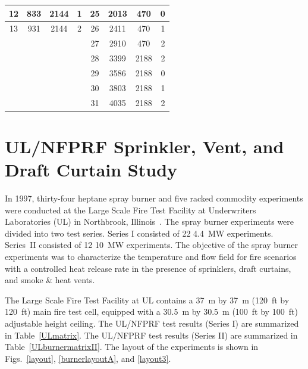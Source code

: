 \begin{table}[h!]
\begin{center}
\begin{tabular}{|c|c|c|c||c|c|c|c|}
12      & 833       & 2144          & 1         & 25      & 2013      & 470           & 0                 \\ \hline
13      & 931       & 2144          & 2         & 26      & 2411      & 470           & 1                 \\ \hline
\multicolumn{4}{|r||}{}                         & 27      & 2910      & 470           & 2                 \\ \cline{5-8}
\multicolumn{4}{|r||}{}                         & 28      & 3399      & 2188          & 2                 \\ \cline{5-8}
\multicolumn{4}{|r||}{}                         & 29      & 3586      & 2188          & 0                 \\ \cline{5-8}
\multicolumn{4}{|r||}{}                         & 30      & 3803      & 2188          & 1                 \\ \cline{5-8}
\multicolumn{4}{|r||}{}                         & 31      & 4035      & 2188          & 2                 \\ \hline
\end{tabular}
\end{center}
\label{UL_NIST_Table}
\end{table}




\section{UL/NFPRF Sprinkler, Vent, and Draft Curtain Study}
\label{UL_NFPRF_Description}

In 1997, thirty-four heptane spray burner and five racked commodity experiments were conducted at the Large Scale Fire Test Facility at Underwriters Laboratories (UL) in Northbrook, Illinois~\cite{Sheppard:1,McGrattan:5}. The spray burner experiments were divided into two test series. Series I consisted of 22 4.4~MW experiments. Series~II consisted of 12 10~MW experiments. The objective of the spray burner experiments was to characterize the temperature and flow field for fire scenarios with a controlled heat release rate in the presence of sprinklers, draft curtains, and smoke \& heat vents.

The Large Scale Fire Test Facility at UL contains a 37~m by 37~m (120~ft by 120~ft) main fire test cell, equipped with a 30.5~m by 30.5~m (100~ft by 100~ft) adjustable height ceiling. The UL/NFPRF test results (Series I) are summarized in Table~\ref{ULmatrix}. The UL/NFPRF test results (Series II) are summarized in Table~\ref{ULburnermatrixII}. The layout of the experiments is shown in Figs.~\ref{layout}, \ref{burnerlayoutA}, and \ref{layout3}.

